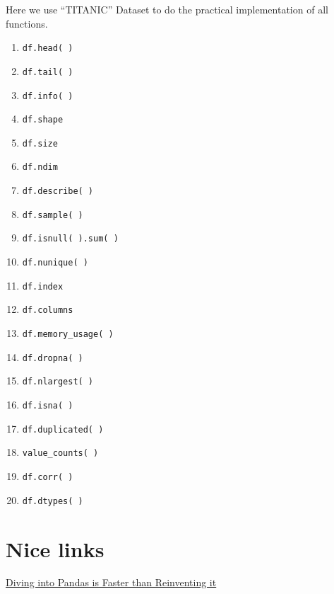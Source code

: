 \documentclass[11pt,a4paper]{article}
\begin{document}
\smallskip \smallskip
\noindent
Here we use  ``TITANIC'' Dataset to do the practical implementation of all functions.


\begin{enumerate}
  \item {\tt df.head( )}
  \item {\tt df.tail( )}
        \item {\tt df.info( )}
      \item {\tt df.shape}
        \item {\tt df.size}
          \item {\tt df.ndim}
            \item {\tt df.describe( ) }
              \item {\tt  df.sample( ) }
                \item {\tt df.isnull( ).sum( ) }
                  \item {\tt  df.nunique( )}
                  \item {\tt df.index}
                    \item{\tt df.columns}
                      \item {\tt df.memory\_usage( )}
                        \item {\tt df.dropna( )}
                          \item {\tt df.nlargest( )}
                            \item {\tt df.isna( )}
                            \item {\tt df.duplicated( )}
                            \item{\tt  value\_counts( )}
                            \item{\tt df.corr( )}
                              \item{\tt df.dtypes( )}
\end{enumerate}



\section{Nice links}
\href{http://deanla.com/dont_reinvent_pandas.html}{Diving into Pandas is Faster than Reinventing it}






\end{document}
